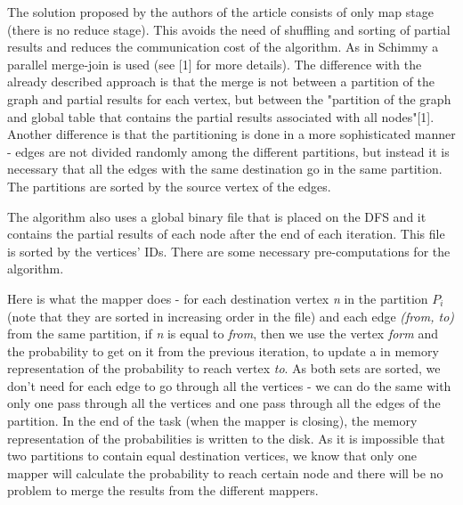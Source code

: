 \documentclass[12pt]{article}
\theoremstyle{plain}
\begin{document}
  The solution proposed by the authors of the article consists of only map
  stage (there is no reduce stage).  This avoids the need of shuffling and
  sorting of partial results and reduces the communication cost of the
  algorithm. As in Schimmy a parallel merge-join is used (see [1] for more
  details). The difference with the already described approach is that the
  merge is not between a partition of the graph and partial results for each
  vertex, but between the "partition of the graph and global table that
  contains the partial results associated with all nodes"[1]. Another
  difference is that the partitioning is done in a more sophisticated manner -
  edges are not divided randomly among the different partitions, but instead it
  is necessary that all the edges with the same destination go in the same
  partition. The partitions are sorted by the source vertex of the edges. 

  The algorithm also uses a global binary file that is placed on the DFS and it
  contains the partial results of each node after the end of each iteration. 
  This file is sorted by the vertices' IDs. There are some necessary
  pre-computations for the algorithm.  

  Here is what the mapper does - for each destination vertex \emph{n} in the
  partition $P_i$ (note that they are sorted in increasing order in the file)
  and each edge \emph{(from, to)} from the same partition, if \emph{n} is equal
  to \emph{from}, then we use the vertex \emph{form} and the probability to
  get on it from the previous iteration, to update a in memory representation
  of the probability to reach vertex \emph{to}. As both sets are sorted, we
  don't need for each edge to go through all the vertices - we can do the same
  with only one pass through all the vertices and one pass through all the
  edges of the partition. In the end of the task (when the mapper is closing),
  the memory representation of the probabilities is written to the disk. As it
  is impossible that two partitions to contain equal destination vertices, we
  know that only one mapper will calculate the probability to reach certain
  node and there will be no problem to merge the results from the different
  mappers. 
\end{document}
